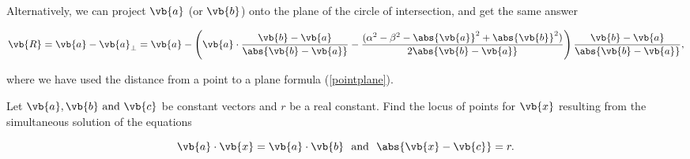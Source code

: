 \documentclass[a4paper,12pt]{report}
\begin{document}
{Alternatively, we can project \(\vb{a} \) (or \(\vb{b} \)) onto the plane of the circle of intersection, and get the same answer 

\begin{equation}
    \vb{R} = \vb{a} - \vb{a} _{\perp } = \vb{a} - \left( \vb{a} \cdot \frac{\vb{b} -\vb{a} }{\abs{\vb{b} -\vb{a} } } -\frac{(\alpha ^2-\beta ^2 - \abs{\vb{a} }^2 + \abs{\vb{b} }^2)}{2\abs{\vb{b} -\vb{a} } }  \right) \frac{\vb{b} -\vb{a} }{\abs{\vb{b} -\vb{a} } },
\end{equation}

where we have used the distance from a point to a plane formula (\cref{pointplane}).
} 

{Let \(\vb{a} ,\vb{b} \text { and } \vb{c} \) be constant vectors and \(r\) be a real constant. Find the locus of points for \(\vb{x} \) resulting from the simultaneous solution of the equations 

\begin{equation}
    \vb{a} \cdot \vb{x} = \vb{a} \cdot \vb{b} ~\text { and }~ \abs{\vb{x} -\vb{c} } = r. 
\end{equation}
~
}
\end{document}
